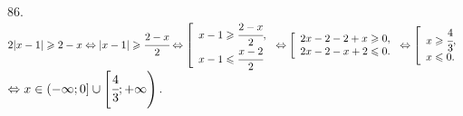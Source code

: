 86. $2|x-1|\geqslant 2-x\Leftrightarrow |x-1|\geqslant \cfrac{2-x}{2} \Leftrightarrow \left[\begin{array}{l} x-1\geqslant \cfrac{2-x}{2},\\
x-1\leqslant \cfrac{x-2}{2}\end{array}\right. \Leftrightarrow \left[\begin{array}{l} 2x-2-2+x\geqslant 0,\\
2x-2-x+2\leqslant 0.\end{array}\right. \Leftrightarrow \left[\begin{array}{l} x\geqslant \cfrac{4}{3},\\
x\leqslant 0.\end{array}\right. $\\$\Leftrightarrow x\in(-\infty;0]\cup\left[\cfrac{4}{3};+\infty\right).$\\

